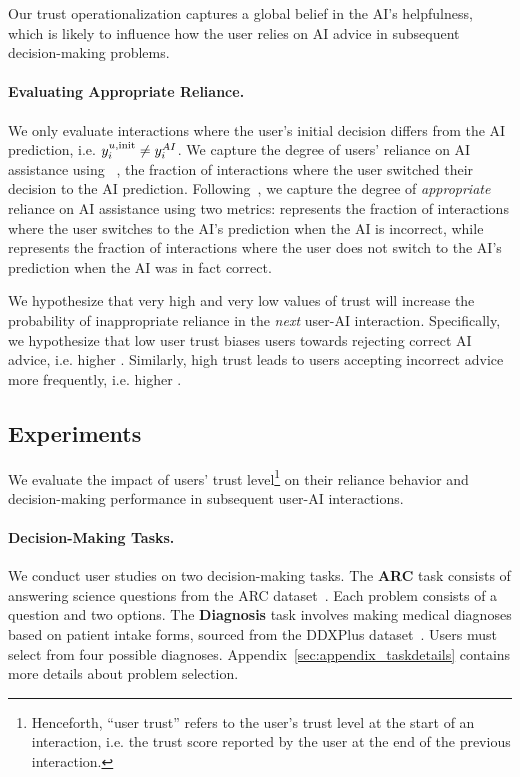Our trust operationalization captures a global belief in the AI's helpfulness, which is likely to influence how the user relies on AI advice in subsequent decision-making problems. 

\paragraph{Evaluating Appropriate Reliance.} 
We only evaluate interactions where the user's initial decision differs from the AI prediction, i.e. $y^{u,\text{init}}_i \neq y^{AI}_i$. 
We capture the degree of users' reliance on AI assistance using \textbf{\switchrate}~\cite{yin2019understanding, zhang2020effect}, the fraction of interactions where the user switched their decision to the AI prediction. 
Following~\citet{ma2024you}, we capture the degree of \emph{appropriate} reliance on AI assistance using two metrics: \textbf{\overreliance} represents the fraction of interactions where the user switches to the AI's prediction when the AI is incorrect, while \textbf{\underreliance} represents the fraction of interactions where the user does not switch to the AI's prediction when the AI was in fact correct.

We hypothesize that very high and very low values of trust will increase the probability of inappropriate reliance in the \emph{next} user-AI interaction. 
Specifically, we hypothesize that low user trust biases users towards rejecting correct AI advice, i.e. higher \underreliance. 
Similarly, high trust leads to users accepting incorrect advice more frequently, i.e. higher \overreliance.


\subsection{Experiments}
\label{subsec:initial_trust_experiments}
We evaluate the impact of users' trust level\footnote{Henceforth, ``user trust'' refers to the user's trust level at the start of an interaction, i.e. the trust score reported by the user at the end of the previous interaction.} on their reliance behavior and decision-making performance in subsequent user-AI interactions.

\paragraph{Decision-Making Tasks.} 
We conduct user studies on two decision-making tasks. 
The \textbf{ARC} task consists of answering science questions from the ARC dataset~\cite{allenai:arc}. 
Each problem consists of a question and two options. 
The \textbf{Diagnosis} task involves making medical diagnoses based on patient intake forms, sourced from the DDXPlus dataset~\cite{fansi2022ddxplus}. 
Users must select from four possible diagnoses. 
Appendix~\ref{sec:appendix_taskdetails} contains more details about problem selection.


